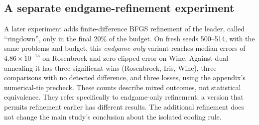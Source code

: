 \documentclass[10pt,a4paper]{article}
\begin{document}
\subsection{A separate endgame-refinement experiment}

A later experiment adds finite-difference BFGS refinement of the leader, called
``ringdown'', only in the final $20\%$ of the budget. On fresh seeds 500--514,
with the same problems and budget, this \emph{endgame-only} variant reaches
median errors of $4.86\times10^{-15}$ on Rosenbrock and zero clipped error on
Wine. Against dual annealing it has three significant wins (Rosenbrock, Iris,
Wine), three comparisons with no detected difference, and three losses, using
the appendix's numerical-tie precheck. These counts describe mixed outcomes,
not statistical equivalence. They refer specifically to endgame-only
refinement; a version that permits refinement earlier has different results.
The additional refinement does not change the main study's conclusion about
the isolated cooling rule.
\end{document}
